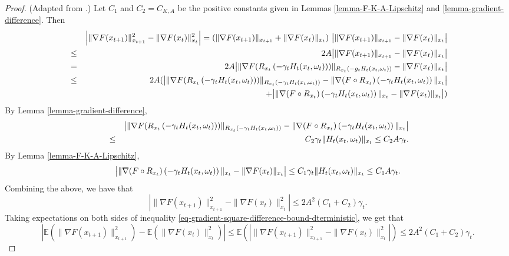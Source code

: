 \documentclass{amsart}
\newcommand{\E}{\mathbb{E}}
\newcommand{\g}{\gamma}
\theoremstyle{plain}
\theoremstyle{definition}
\theoremstyle{remark}
\numberwithin{theorem}{section}
\numberwithin{equation}{section}
\begin{document}
\begin{proof}(Adapted from \cite{Li-Orabona}.)
Let $C_1$ and $C_2=C_{K,A}$ be the positive constants given in Lemmas \ref{lemma-F-K-A-Lipschitz} and \ref{lemma-gradient-difference}. Then 
\begin{eqnarray*}
&& \left|\|\nabla F(x_{t+1})\|_{x_{t+1}}^2 -\|\nabla F(x_{t})\|_{x_{t}}^2\right| = (\|\nabla F(x_{t+1})\|_{x_{t+1}}+\|\nabla F(x_{t})\|_{x_{t}})~\big{|}\|\nabla F(x_{t+1})\|_{x_{t+1}} -\|\nabla F(x_{t})\|_{x_{t}}\big{|} \\
& \leq & 2A\big{|}\|\nabla F(x_{t+1})\|_{x_{t+1}} -\|\nabla F(x_{t})\|_{x_{t}}\big{|}\\
& = & 2A\big{|}\|\nabla F(R_{x_t}\left(-\g_t H_t(x_t,\omega_t)\right))\|_{R_{x_t}\left(-g_t H_t(x_t,\omega_t)\right)} -\|\nabla F(x_{t})\|_{x_{t}}\big{|} \\
& \leq & 2A(\big{|}\|\nabla F(R_{x_t}\left(-\g_t H_t(x_t,\omega_t)\right))\|_{R_{x_t}\left(-\g_t H_t(x_t,\omega_t)\right)} -\|\nabla (F\circ R_{x_t})\left(-\g_t H_t(x_t,\omega_t)\right)\|_{x_{t}}\big{|} \\
&& +  \big{|} \|\nabla (F\circ R_{x_t})\left(-\g_t H_t(x_t,\omega_t)\right)\|_{x_{t}}  -\|\nabla F(x_{t})\|_{x_{t}}\big{|})
\end{eqnarray*}
By Lemma \ref{lemma-gradient-difference},
\begin{eqnarray*}
&& \big{|}\|\nabla F(R_{x_t}\left(-\g_t H_t(x_t,\omega_t)\right))\|_{R_{x_t}\left(-\g_t H_t(x_t,\omega_t)\right)} -\|\nabla (F\circ R_{x_t})\left(-\g_t H_t(x_t,\omega_t)\right)\|_{x_{t}}\big{|} \\
& \leq &  C_2 \g_t  \|H_t(x_t,\omega_t)\|_{x_{t}} \leq C_2 A \g_t.
\end{eqnarray*}
By Lemma \ref{lemma-F-K-A-Lipschitz},
\[
\big{|} \|\nabla (F\circ R_{x_t})\left(-\g_t H_t(x_t,\omega_t)\right)\|_{x_{t}} -\|\nabla F(x_{t})\|_{x_{t}}\big{|} \leq C_1\g_t  \|H_t(x_t,\omega_t)\|_{x_{t}}\leq C_1 A \g_t.
\]
Combining the above, we have that
\begin{equation}\label{eq-gradient-square-difference-bound-dterministic}
\left|\|\nabla F(x_{t+1})\|_{x_{t+1}}^2 -\|\nabla F(x_{t})\|_{x_{t}}^2\right| \leq 2 A^2 (C_1+C_2) \g_t.
\end{equation}
Taking expectations on both sides of inequality \eqref{eq-gradient-square-difference-bound-dterministic}, we get that 
\begin{equation}\label{eq-gradient-square-difference-bound-dterministic-exp}
\left|\E(\|\nabla F(x_{t+1})\|_{x_{t+1}}^2) -\E(\|\nabla F(x_{t})\|_{x_{t}}^2)\right|\leq \E\left(\left|\|\nabla F(x_{t+1})\|_{x_{t+1}}^2 -\|\nabla F(x_{t})\|_{x_{t}}^2\right|\right) \leq 2 A^2 (C_1+C_2) \g_t.
\end{equation}


\end{proof}
\end{document}
